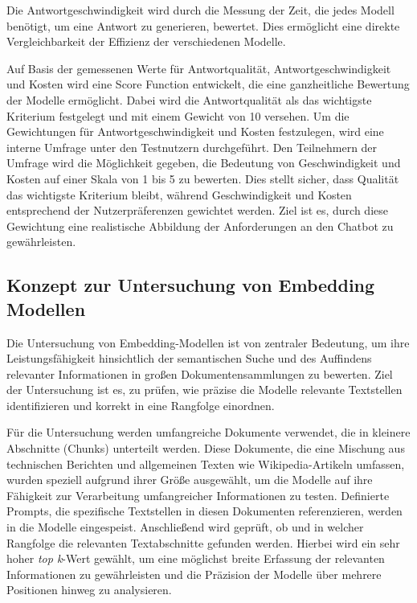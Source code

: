 Die Antwortgeschwindigkeit wird durch die Messung der Zeit, die jedes Modell benötigt, um eine Antwort zu generieren, bewertet. Dies ermöglicht eine direkte Vergleichbarkeit der Effizienz der verschiedenen Modelle.

Auf Basis der gemessenen Werte für Antwortqualität, Antwortgeschwindigkeit und Kosten wird eine Score Function entwickelt, die eine ganzheitliche Bewertung der Modelle ermöglicht. 
Dabei wird die Antwortqualität als das wichtigste Kriterium festgelegt und mit einem Gewicht von 10 versehen. Um die Gewichtungen für Antwortgeschwindigkeit und Kosten festzulegen, 
wird eine interne Umfrage unter den Testnutzern durchgeführt. Den Teilnehmern der Umfrage wird die Möglichkeit gegeben, die Bedeutung von Geschwindigkeit und Kosten auf einer Skala von 1 bis 5 zu bewerten. 
Dies stellt sicher, dass Qualität das wichtigste Kriterium bleibt, während Geschwindigkeit und Kosten entsprechend der Nutzerpräferenzen gewichtet werden. 
Ziel ist es, durch diese Gewichtung eine realistische Abbildung der Anforderungen an den Chatbot zu gewährleisten.

\subsection{Konzept zur Untersuchung von Embedding Modellen}
\label{eval_embedding_konzept}

Die Untersuchung von Embedding-Modellen ist von zentraler Bedeutung, um ihre Leistungsfähigkeit hinsichtlich der semantischen Suche und des Auffindens relevanter Informationen in großen Dokumentensammlungen zu bewerten. 
Ziel der Untersuchung ist es, zu prüfen, wie präzise die Modelle relevante Textstellen identifizieren und korrekt in eine Rangfolge einordnen.

Für die Untersuchung werden umfangreiche Dokumente verwendet, die in kleinere Abschnitte (Chunks) unterteilt werden. 
Diese Dokumente, die eine Mischung aus technischen Berichten und allgemeinen Texten wie Wikipedia-Artikeln umfassen, wurden speziell aufgrund ihrer Größe ausgewählt, 
um die Modelle auf ihre Fähigkeit zur Verarbeitung umfangreicher Informationen zu testen. Definierte Prompts, die spezifische Textstellen in diesen Dokumenten referenzieren, werden in die Modelle eingespeist. 
Anschließend wird geprüft, ob und in welcher Rangfolge die relevanten Textabschnitte gefunden werden. Hierbei wird ein sehr hoher \textit{top k}-Wert gewählt, 
um eine möglichst breite Erfassung der relevanten Informationen zu gewährleisten und die Präzision der Modelle über mehrere Positionen hinweg zu analysieren.

